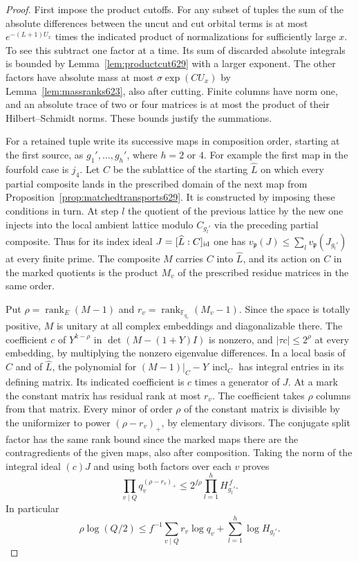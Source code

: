 \documentclass[a4paper,11pt]{article}
\theoremstyle{definition}
\theoremstyle{remark}
\numberwithin{equation}{section}
\begin{document}
\begin{proof}
First impose the product cutoffs. For any subset of tuples the sum
of the absolute differences between the uncut and cut orbital terms
is at most \(e^{-(L+1)U_x}\) times the indicated product of
normalizations for sufficiently large \(x\). To see this subtract
one factor at a time. Its sum of discarded absolute integrals is
bounded by Lemma~\ref{lem:productcut629} with a larger exponent.
The other factors have absolute mass at most
\(\sigma\exp(CU_x)\) by Lemma~\ref{lem:massranks623}, also after
cutting. Finite columns have norm one, and an absolute trace of
two or four matrices is at most the product of their
Hilbert--Schmidt norms. These bounds justify the summations.

For a retained tuple write its successive maps in composition
order, starting at the first source, as \(g_1',\ldots,g_h'\),
where \(h=2\) or \(4\). For example the first map in the fourfold
case is \(j_4\). Let \(C\) be the sublattice of the starting
\(\widehat L\) on which every partial composite lands in the
prescribed domain of the next map from
Proposition~\ref{prop:matchedtransports629}. It is constructed
by imposing these conditions in turn. At step \(l\) the quotient
of the previous lattice by the new one injects into the local
ambient lattice modulo \(C_{g_l'}\) via the preceding partial
composite. Thus for its index ideal \(J=[\widehat L:C]_{\rm id}\)
one has \(v_\mathfrak p(J)\le\sum_l v_\mathfrak p(J_{g_l'})\)
at every finite prime. The composite \(M\) carries \(C\) into
\(\widehat L\), and its action on \(C\) in the marked quotients is
the product \(M_v\) of the prescribed residue matrices in the
same order.

Put \(\rho=\operatorname{rank}_E(M-1)\) and
\(r_v=\operatorname{rank}_{\mathbb F_{q_v}}(M_v-1)\). Since the
space is totally positive, \(M\) is unitary at all complex embeddings
and diagonalizable there. The coefficient \(c\) of \(Y^{k-\rho}\) in
\(\det(M-(1+Y)I)\) is nonzero, and
\(|\tau c|\le 2^\rho\) at every embedding, by multiplying the
nonzero eigenvalue differences. In a local basis of \(C\) and of
\(\widehat L\), the polynomial for
\((M-1)|_C-Y\,\operatorname{incl}_C\) has integral entries in its
defining matrix. Its indicated coefficient is \(c\) times a generator
of \(J\). At a mark the constant matrix has residual rank at most
\(r_v\). The coefficient takes \(\rho\) columns from that matrix.
Every minor of order \(\rho\) of the constant matrix is divisible by
the uniformizer to power \((\rho-r_v)_+\), by elementary divisors.
The conjugate split factor has the same rank bound since the
marked maps there are the contragredients of the given maps, also
after composition. Taking the norm of the integral ideal \((c)J\)
and using both factors over each \(v\) proves
\[
 \prod_{v\mid Q} q_v^{(\rho-r_v)_+}
       \le 2^{f\rho}\prod_{l=1}^{h} H_{g_l'}^{\,f}.
\]
In particular
\[
 \rho\log(Q/2)
     \le f^{-1}\sum_{v\mid Q} r_v\log q_v+
                                   \sum_{l=1}^{h}\log H_{g_l'} .
\]


\end{proof}
\end{document}
